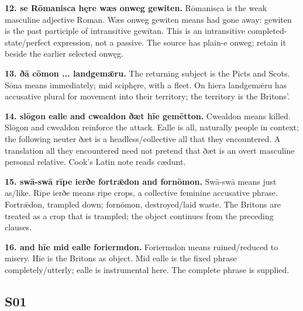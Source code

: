 \textbf{12. se Rōmanisca hęre wæs onweg gewiten.} Rōmanisca is the weak masculine adjective Roman. Wæs onweg gewiten means had gone away: gewiten is the past participle of intransitive gewītan. This is an intransitive completed-state/\allowbreak{}perfect expression, not a passive. The source has plain-e onweg; retain it beside the earlier selected onwęg.

\textbf{13. ðā cōmon ... landgemǣru.} The returning subject is the Picts and Scots. Sōna means immediately; mid sciphęre, with a fleet. On hiera landgemǣru has accusative plural for movement into their territory; the territory is the Britons’.

\textbf{14. slōgon ealle and cwealdon ðæt hīe gemētton.} Cwealdon means killed. Slōgon and cwealdon reinforce the attack. Ealle is all, naturally people in context; the following neuter ðæt is a headless/\allowbreak{}collective all that they encountered. A translation all they encountered need not pretend that ðæt is an overt masculine personal relative. Cook’s Latin note reads cædunt.

\textbf{15. swā-swā rīpe ierðe fortrǣdon and fornōmon.} Swā-swā means just as/\allowbreak{}like. Rīpe ierðe means ripe crops, a collective feminine accusative phrase. Fortrǣdon, trampled down; fornōmon, destroyed/\allowbreak{}laid waste. The Britons are treated as a crop that is trampled; the object continues from the preceding clauses.

\textbf{16. and hīe mid ealle foriermdon.} Foriermdon means ruined/\allowbreak{}reduced to misery. Hīe is the Britons as object. Mid ealle is the fixed phrase completely/\allowbreak{}utterly; ealle is instrumental here. The complete phrase is supplied.

\subsection*{S01}

